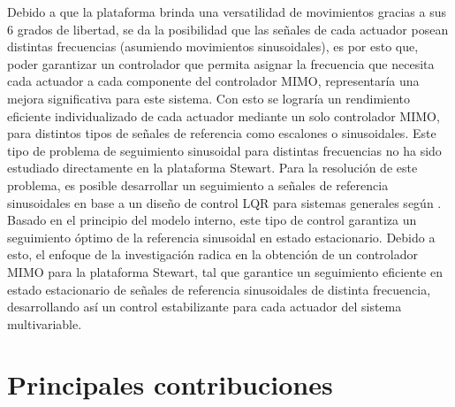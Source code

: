 Debido a que la plataforma brinda una versatilidad de movimientos gracias a sus 6 grados de libertad, se da la posibilidad que las señales de cada actuador posean distintas frecuencias (asumiendo movimientos sinusoidales), es por esto que, poder garantizar un controlador que permita asignar la frecuencia que necesita cada actuador a cada componente del controlador MIMO, representaría una mejora significativa para este sistema. Con esto se lograría un rendimiento eficiente individualizado de cada actuador mediante un solo controlador MIMO, para distintos tipos de señales de referencia como escalones o sinusoidales. Este tipo de problema de seguimiento sinusoidal para distintas frecuencias no ha sido estudiado directamente en la plataforma Stewart. Para la resolución de este problema, es posible desarrollar un seguimiento a señales de referencia sinusoidales en base a un diseño de control LQR para sistemas generales según \cite{lin1996outputregulation,yan2016outputregulation,huang2004bookoutputregulation}. Basado en el principio del modelo interno, este tipo de control garantiza un seguimiento óptimo de la referencia sinusoidal en estado estacionario. Debido a esto, el enfoque de la investigación radica en la obtención de un controlador MIMO para la plataforma Stewart, tal que garantice un seguimiento eficiente en estado estacionario de señales de referencia sinusoidales de distinta frecuencia, desarrollando así un control estabilizante para cada actuador del sistema multivariable.


\section{Principales contribuciones}


